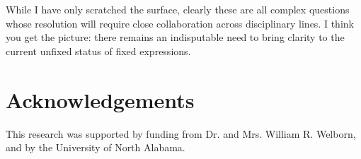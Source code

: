 \documentclass[english,output=paper,colorlinks,citecolor=brown]{../langscibook}
\begin{document}
While I have only scratched the surface, clearly these are all complex questions whose resolution will require close collaboration across disciplinary lines. I think you get the picture: there remains an indisputable need to bring clarity to the current unfixed status of fixed expressions.

\section*{Acknowledgements}
This research was supported by funding from Dr. and Mrs. William R. Welborn, and by the University of North Alabama.

{\sloppy\printbibliography[heading=subbibliography,notkeyword=this]}
\end{document}
